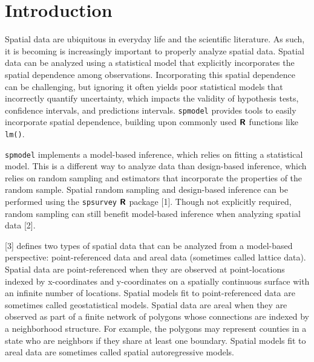 \documentclass[10pt,letterpaper]{article}
\begin{document}
\linenumbers

\hypertarget{sec:introduction}{%
\section{Introduction}\label{sec:introduction}}

Spatial data are ubiquitous in everyday life and the scientific
literature. As such, it is becoming is increasingly important to
properly analyze spatial data. Spatial data can be analyzed using a
statistical model that explicitly incorporates the spatial dependence
among observations. Incorporating this spatial dependence can be
challenging, but ignoring it often yields poor statistical models that
incorrectly quantify uncertainty, which impacts the validity of
hypothesis tests, confidence intervals, and predictions intervals.
\texttt{spmodel} provides tools to easily incorporate spatial
dependence, building upon commonly used \(\textbf{\textsf{R}}\)
functions like \texttt{lm()}.

\texttt{spmodel} implements a model-based inference, which relies on
fitting a statistical model. This is a different way to analyze data
than design-based inference, which relies on random sampling and
estimators that incorporate the properties of the random sample. Spatial
random sampling and design-based inference can be performed using the
\texttt{spsurvey} \(\textbf{\textsf{R}}\) package {[}1{]}. Though not
explicitly required, random sampling can still benefit model-based
inference when analyzing spatial data {[}2{]}.

{[}3{]} defines two types of spatial data that can be analyzed from a
model-based perspective: point-referenced data and areal data (sometimes
called lattice data). Spatial data are point-referenced when they are
observed at point-locations indexed by x-coordinates and y-coordinates
on a spatially continuous surface with an infinite number of locations.
Spatial models fit to point-referenced data are sometimes called
geostatistical models. Spatial data are areal when they are observed as
part of a finite network of polygons whose connections are indexed by a
neighborhood structure. For example, the polygons may represent counties
in a state who are neighbors if they share at least one boundary.
Spatial models fit to areal data are sometimes called spatial
autoregressive models.
\end{document}

